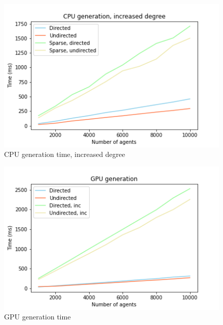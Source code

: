 \documentclass{article}
\begin{document}
\begin{center}
    \begin{figure}[!htbp]
        \centering
        \includegraphics[width=.8\textwidth]{ThesisKI/Images/CPU_inc.png}
        \caption{CPU generation time, increased degree}
        \label{CPU:increased}
    \end{figure}
\end{center}

\begin{center}
    \begin{figure}[!htbp]
        \centering
        \includegraphics[width=.8\textwidth]{ThesisKI/Images/GPU.png}
        \caption{GPU generation time}
        \label{GPU:all}
    \end{figure}
\end{center}
\end{document}
